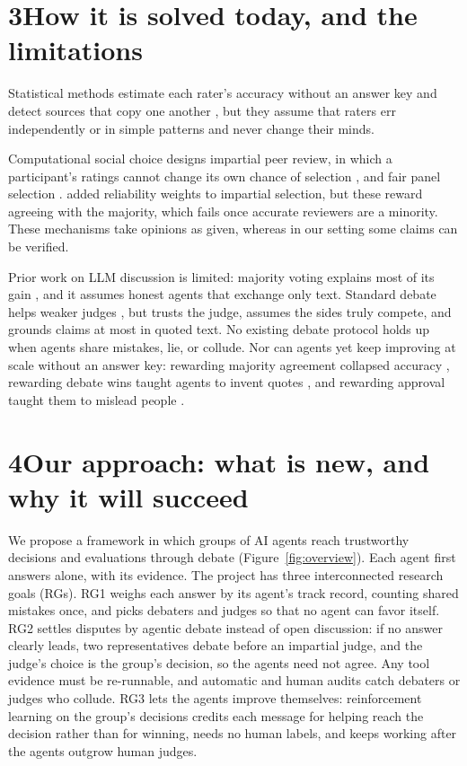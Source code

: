 \documentclass[12pt,letterpaper]{article}
\begin{document}
\section*{3\quad How it is solved today, and the limitations}
Statistical methods estimate each rater's accuracy without an answer key \citep{dawid1979maximum,whitehill2009whose} and detect sources that copy one another \citep{dong2009dependence}, but they assume that raters err independently or in simple patterns \citep{jaffe2016dependent} and never change their minds.

Computational social choice designs impartial peer review, in which a participant's ratings cannot change its own chance of selection \citep{kurokawa2015impartial,alon2011sum}, and fair panel selection \citep{flanigan2021fair}. \citet{lev2023peernomination} added reliability weights to impartial selection, but these reward agreeing with the majority, which fails once accurate reviewers are a minority. These mechanisms take opinions as given, whereas in our setting some claims can be verified.

Prior work on LLM discussion \citep{du2024debate,li2024prd} is limited: majority voting explains most of its gain \citep{choi2025debate}, and it assumes honest agents that exchange only text. Standard debate helps weaker judges \citep{irving2018debate,khan2024debating}, but trusts the judge, assumes the sides truly compete, and grounds claims at most in quoted text. No existing debate protocol holds up when agents share mistakes, lie, or collude. Nor can agents yet keep improving at scale without an answer key: rewarding majority agreement collapsed accuracy \citep{shafayat2025selftrain}, rewarding debate wins taught agents to invent quotes \citep{kenton2026debate}, and rewarding approval taught them to mislead people \citep{wen2025mislead}.

\section*{4\quad Our approach: what is new, and why it will succeed}
We propose a framework in which groups of AI agents reach trustworthy decisions and evaluations through debate (Figure~\ref{fig:overview}). Each agent first answers alone, with its evidence. The project has three interconnected research goals (RGs). RG1 weighs each answer by its agent's track record, counting shared mistakes once, and picks debaters and judges so that no agent can favor itself. RG2 settles disputes by agentic debate instead of open discussion: if no answer clearly leads, two representatives debate before an impartial judge, and the judge's choice is the group's decision, so the agents need not agree. Any tool evidence must be re-runnable, and automatic and human audits catch debaters or judges who collude. RG3 lets the agents improve themselves: reinforcement learning on the group's decisions credits each message for helping reach the decision rather than for winning, needs no human labels, and keeps working after the agents outgrow human judges.
\end{document}
